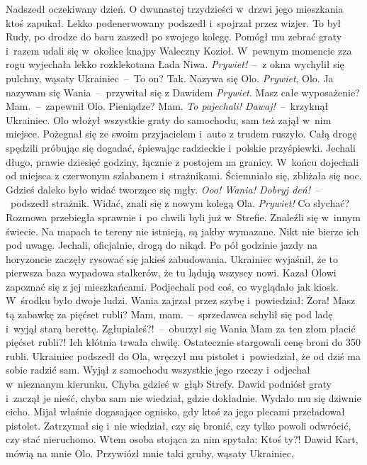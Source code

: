 \documentclass[../MAIN.tex]{subfiles}
\begin{document}
Nadszedł oczekiwany dzień. O dwunastej trzydzieści w~drzwi jego mieszkania ktoś
zapukał. Lekko podenerwowany podszedł i~spojrzał przez wizjer. To był Rudy, po
drodze do baru zaszedł po swojego kolegę. Pomógł mu zebrać graty i~razem udali
się w~okolice knajpy Waleczny Kozioł. W~pewnym momencie zza rogu wyjechała lekko
rozklekotana Łada Niwa.
%
\sx\textit{Prywiet!}~--~z okna wychylił się pulchny, wąsaty Ukrainiec~--~To on?
\xx Tak. Nazywa się Olo.
\xx \textit{Prywiet}, Olo. Ja nazywam się Wania~--~przywitał się z Dawidem
\xx \textit{Prywiet}.
\xx Masz całe wyposażenie?
\xx Mam.~--~zapewnił Olo.
\xx Pieniądze?
\xx Mam.
\xx\textit{To pajechali! Dawaj!}~--~krzyknął Ukrainiec.
\qd
%
Olo włożył wszystkie graty do samochodu, sam też zajął w~nim
miejsce. Pożegnał
się ze swoim przyjacielem i~auto z trudem ruszyło. Całą drogę spędzili próbując
się dogadać, śpiewając radzieckie i~polskie przyśpiewki. Jechali długo, prawie
dziesięć godziny, łącznie z postojem na granicy. W~końcu dojechali od miejsca z
czerwonym szlabanem i~strażnikami. Ściemniało się, zbliżała się noc. Gdzieś
daleko było widać tworzące się mgły.
%
\sx\textit{Ooo! Wania! Dobryj deń!}~--~podszedł strażnik. Widać, znali się z
nowym kolegą Ola.
\xx \textit{Prywiet!} Co słychać?
\qd
Rozmowa przebiegła sprawnie i~po chwili byli już w~Strefie. Znaleźli się w~innym
świecie. Na mapach te tereny nie istnieją, są jakby wymazane. Nikt nie bierze
ich pod uwagę. Jechali, oficjalnie, drogą do nikąd. Po pół godzinie jazdy na
horyzoncie zaczęły rysować się jakieś zabudowania. Ukrainiec wyjaśnił, że to
pierwsza baza wypadowa stalkerów, że tu lądują wszyscy nowi. Kazał Olowi
zapoznać się z jej mieszkańcami.
Podjechali pod coś, co wyglądało jak kiosk. W~środku było dwoje ludzi. Wania
zajrzał przez szybę i~powiedział:
%
\sx Żora! Masz tą zabawkę za pięćset rubli?
\xx Mam, mam.~--~sprzedawca schylił się pod ladę i~wyjął starą berettę.
\xx Zgłupiałeś?!~--~oburzył się Wania
\xx Mam za ten złom płacić pięćset rubli?!
\qm
Ich kłótnia trwała chwilę. Ostatecznie stargowali cenę broni do 350 rubli.
Ukrainiec podszedł do Ola, wręczył mu pistolet i~powiedział, że od dziś ma sobie
radzić sam. Wyjął z samochodu wszystkie jego rzeczy i~odjechał w~nieznanym
kierunku. Chyba gdzieś w~głąb Strefy. Dawid podniósł graty i~zaczął je nieść,
chyba sam nie wiedział, gdzie dokładnie. Wydało mu się dziwnie cicho. Mijał
właśnie dogasające ognisko, gdy ktoś za jego plecami przeładował pistolet.
Zatrzymał się i~nie wiedział, czy się bronić, czy tylko powoli odwrócić, czy
stać nieruchomo. Wtem osoba stojąca za nim spytała:
%
\sx Ktoś ty?!
\xx Dawid Kart, mówią na mnie Olo. Przywiózł mnie taki gruby, wąsaty Ukrainiec,
\end{document}
